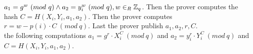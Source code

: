  \begin{math}a_1=g^w \ (mod\ q)  \land a_2=y_i^w \ (mod\ q),  w\in_R \Z_q \end{math}. Then the prover computes the hash \begin{math}C=H(X_i,Y_i,a_1,a_2) \end{math}. Then the prover computes  \begin{math}r=w-p(i)  \cdot  C \ (mod\ q)\end{math}. Last the prover publish \begin{math}a_1, a_2,r,C\end{math}. \\

\noindent
{} the following computations \begin{math}a_1 = g^r \cdot X_i^C  \ (mod\ q)\end{math} and \begin{math} a_2=y_i^r  \cdot  Y_i^C \ (mod\ q)\end{math} and \begin{math}C=H(X_i,Y_i,a_1,a_2)\end{math}.



